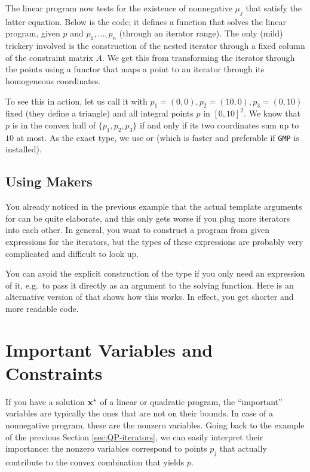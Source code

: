 The linear program now tests for the existence of nonnegative $\mu_j$
that satisfy the latter equation. Below is the code; it defines a
function that solves the linear program, given $p$ and
$p_1,\ldots,p_n$ (through an iterator range). The only (mild)
trickery involved is the construction of the nested iterator 
through a fixed column of the constraint matrix $A$. We get this
from transforming the iterator through the points using a functor 
that maps a point to an iterator through its homogeneous coordinates.


To see this in action, let us call it with $p_1=(0,0), p_2=(10,0),
p_3=(0,10)$ fixed (they define a triangle) and all integral points $p$
in $[0,10]^2$. We know that $p$ is in the convex hull of
$\{p_1,p_2,p_3\}$ if and only if its two coordinates sum up to $10$ at
most. As the exact type, we use  or  
(which is faster and preferable if \texttt{GMP} is installed).


\subsection{Using Makers\label{sec:QP-makers}}
You already noticed in the previous example that the actual 
template arguments for 
can be quite elaborate, and this only gets worse if you plug more 
iterators into each other. In general, you want to construct a 
program from given expressions for the iterators, but the
types of these expressions are probably very complicated and 
difficult to look up. 

You can avoid the explicit construction of the type
if you only need an expression of it, e.g.\ to pass it directly 
as an argument to the solving function. Here is an alternative
version of 
that shows how this works. In effect, you get shorter and more
readable code.



\section{Important Variables and Constraints}
If you have a solution $\mathbf{x}^*$ of a linear or quadratic program,
the ``important'' variables are typically the ones that are not on
their bounds. In case of a nonnegative program, these are the nonzero
variables.  Going back to the example of the previous Section
\ref{sec:QP-iterators}, we can easily interpret their
importance: the nonzero variables correspond to points $p_j$ that
actually contribute to the convex combination that yields $p$. 

